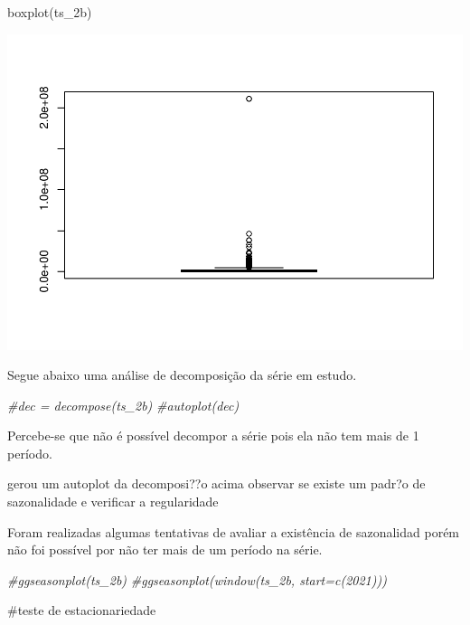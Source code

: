 \documentclass[
]{article}
\newenvironment{Shaded}{\begin{snugshade}}{\end{snugshade}}
\newcommand{\CommentTok}[1]{\textcolor[rgb]{0.56,0.35,0.01}{\textit{#1}}}
\newcommand{\FunctionTok}[1]{\textcolor[rgb]{0.00,0.00,0.00}{#1}}
\newcommand{\NormalTok}[1]{#1}
\begin{document}
\begin{Shaded}
\begin{Highlighting}[]
\FunctionTok{boxplot}\NormalTok{(ts\_2b)}
\end{Highlighting}
\end{Shaded}

\includegraphics{Oncase2b_files/figure-latex/unnamed-chunk-4-3.pdf}

Segue abaixo uma análise de decomposição da série em estudo.

\begin{Shaded}
\begin{Highlighting}[]
\CommentTok{\#dec =   decompose(ts\_2b)}
\CommentTok{\#autoplot(dec)}
\end{Highlighting}
\end{Shaded}

Percebe-se que não é possível decompor a série pois ela não tem mais de
1 período.

gerou um autoplot da decomposi??o acima observar se existe um padr?o de
sazonalidade e verificar a regularidade

Foram realizadas algumas tentativas de avaliar a existência de
sazonalidad porém não foi possível por não ter mais de um período na
série.

\begin{Shaded}
\begin{Highlighting}[]
\CommentTok{\#ggseasonplot(ts\_2b)}
\CommentTok{\#ggseasonplot(window(ts\_2b, start=c(2021)))}
\end{Highlighting}
\end{Shaded}

\#teste de estacionariedade
\end{document}
